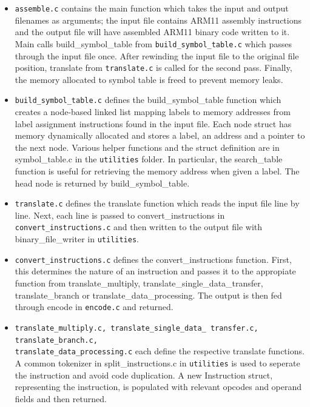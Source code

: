 \documentclass[11pt]{article}
\begin{document}
\begin{itemize}
\item \texttt{assemble.c} contains the main function which takes the input and output filenames as arguments; the input file contains ARM11 assembly instructions and the output file will have assembled ARM11 binary code written to it. Main calls build\_symbol\_table from \texttt{build\_symbol\_table.c} which passes through the input file once. After rewinding the input file to the original file position, translate from \texttt{translate.c} is called for the second pass. Finally, the memory allocated to symbol table is freed to prevent memory leaks.

\item \texttt{build\_symbol\_table.c} defines the build\_symbol\_table function which creates a node-based linked list mapping labels to memory addresses from label assignment instructions found in the input file. Each node struct has memory dynamically allocated and stores a label, an address and a pointer to the next node. Various helper functions and the struct definition are in symbol\_table.c in the \texttt{utilities} folder. In particular, the search\_table function is useful for retrieving the memory address when given a label. The head node is returned by build\_symbol\_table.

\item \texttt{translate.c} defines the translate function which reads the input file line by line. Next, each line is passed to convert\_instructions in \texttt{convert\_instructions.c} and then written to the output file with binary\_file\_writer in \texttt{utilities}.

\item \texttt{convert\_instructions.c} defines the convert\_instructions function. First, this determines the nature of an instruction and passes it to the appropiate function from translate\_multiply, translate\_single\_data\_transfer, translate\_branch or translate\_data\_processing. The output is then fed through encode in \texttt{encode.c} and returned.

\item \texttt{translate\_multiply.c, translate\_single\_data\_ transfer.c, translate\_branch.c,} \\ \texttt{translate\_data\_processing.c} each define the respective translate functions. A common tokenizer in split\_instructions.c in \texttt{utilities} is used to seperate the instruction and avoid code duplication. A new Instruction struct, representing the instruction, is populated with relevant opcodes and operand fields and then returned.


\end{itemize}
\end{document}
